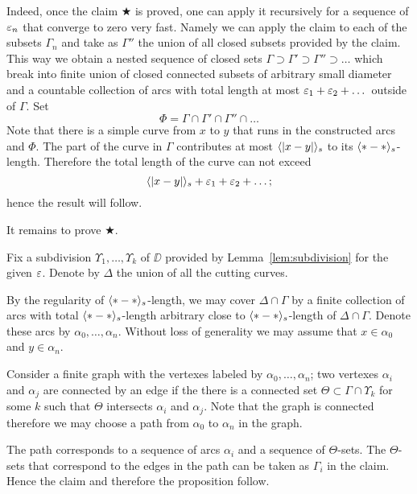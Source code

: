 Indeed, once the claim $\bigstar$ is proved, one can apply it recursively for a sequence of $\varepsilon_n$ that converge to zero very fast.
Namely we can apply the claim to each of the subsets $\Gamma_n$ and take as $\Gamma''$ the union of all closed subsets provided by the claim.
This way we obtain a nested sequence of closed sets $\Gamma\supset \Gamma'\supset\Gamma''\supset\dots$ which break into finite union of closed connected subsets of arbitrary small diameter
and a countable collection of arcs with total length at most $\varepsilon_1+\varepsilon_2+\dots$ 
outside of $\Gamma$.
Set 
\[\Phi=\Gamma\cap \Gamma'\cap\Gamma''\cap\dots\]
Note that there is a simple curve from $x$ to $y$ that runs in the constructed arcs and $\Phi$.
The part of the curve in $\Gamma$ contributes at most $\langle|x-y|\rangle_s$ to its $\langle{*}-{*}\rangle_s$-length.
Therefore the total length of the curve can not exceed 
\[\langle|x-y|\rangle_s+\varepsilon_1+\varepsilon_2+\dots;\]
hence the result will follow.

It remains to prove $\bigstar$.

Fix a subdivision $\Upsilon_1,\dots,\Upsilon_k$ of $\DD$ provided by Lemma~\ref{lem:subdivision} for the given $\varepsilon$.
Denote by $\Delta$ the union of all the cutting curves.

By the regularity of $\langle{*}-{*}\rangle_s$-length, we may cover $\Delta\cap\Gamma$ by a finite collection of arcs with total  $\langle{*}-{*}\rangle_s$-length arbitrary close to $\langle{*}-{*}\rangle_s$-length of $\Delta\cap\Gamma$.
Denote these arcs by $\alpha_0,\dots,\alpha_n$.
Without loss of generality we may assume that $x\in\alpha_0$ and $y\in\alpha_n$.

Consider a finite graph with the vertexes labeled by $\alpha_0,\dots,\alpha_n$;
two vertexes $\alpha_i$ and $\alpha_j$ are connected by an edge if the there is a connected set $\Theta\subset \Gamma\cap\Upsilon_k$ for some $k$ such that $\Theta$ intersects $\alpha_i$ and $\alpha_j$.
Note that the graph is connected therefore we may choose a path from $\alpha_0$ to $\alpha_n$ in the graph.

The path corresponds to a sequence of arcs $\alpha_i$ and a sequence of $\Theta$-sets.
The $\Theta$-sets that correspond to the edges in the path can be taken as $\Gamma_i$ in the claim.
Hence the claim and therefore the proposition follow. 
\qeds




